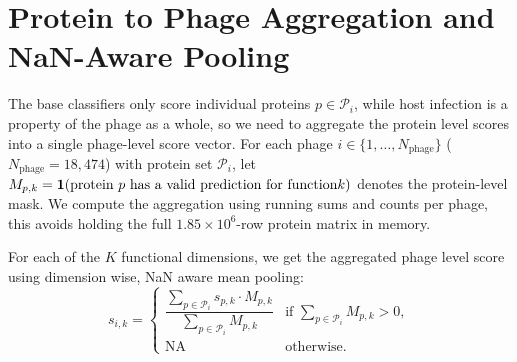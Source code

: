 \section{Protein to Phage Aggregation and NaN-Aware Pooling}
\label{sec4.2: aggregation}
The base classifiers only score individual proteins $p \in \mathcal{P}_i$, while host infection is a property of the 
phage as a whole, so we need to aggregate the protein level scores into a single phage-level score vector. For each phage 
$i \in \{1, \ldots, N_{\text{phage}}\}$ ($N_{\text{phage}} = 18{,}474$) with protein set $\mathcal{P}_i$, let $M_{p,k} = 
\mathbf{1}(\text{protein } p \text{ has a valid prediction for function\\\\\\\\\\\\\\\\\\\\\\\\\\\\\\\\\\\\\\\\\\\\\\\\\\\\\\\\ } k)$ denotes the protein-level mask. We compute the 
aggregation using running sums and counts per phage, this avoids holding the full $1.85 \times 10^6$-row protein matrix in memory.


For each of the $K$ functional dimensions, we get the aggregated phage level score using dimension wise, NaN aware 
mean pooling:
\begin{equation}
\label{eq: nan-mean-pooling}
s_{i,k} = \begin{cases}
\dfrac{\sum_{p \in \mathcal{P}_i} s_{p,k} \cdot M_{p,k}}{\sum_{p \in \mathcal{P}_i} M_{p,k}} & \text{if } 
\sum_{p \in \mathcal{P}_i} M_{p,k} > 0, \\[10pt]
\text{NA} & \text{otherwise.}
\end{cases}
\end{equation}

